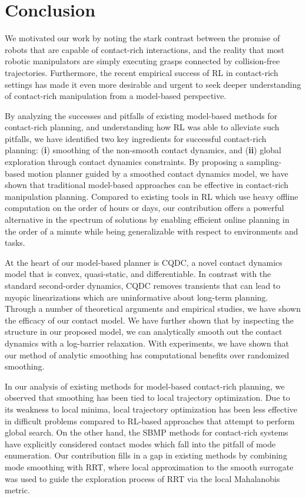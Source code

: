 \chapter{Conclusion} 
We motivated our work by noting the stark contrast between the promise of robots that are capable of contact-rich interactions, and the reality that most robotic manipulators are simply executing grasps connected by collision-free trajectories. Furthermore, the recent empirical success of RL in contact-rich settings has made it even more desirable and urgent to seek deeper understanding of contact-rich manipulation from a model-based perspective. 

By analyzing the successes and pitfalls of existing model-based methods for contact-rich planning, and understanding how RL was able to alleviate such pitfalls, we have identified two key ingredients for successful contact-rich planning: (\textbf{i}) smoothing of the non-smooth contact dynamics, and (\textbf{ii}) global exploration through contact dynamics constraints. By proposing a sampling-based motion planner guided by a smoothed contact dynamics model, we have shown that traditional model-based approaches can be effective in contact-rich manipulation planning. Compared to existing tools in RL which use heavy offline computation on the order of hours or days, our contribution offers a powerful alternative in the spectrum of solutions by enabling efficient online planning in the order of a minute while being generalizable with respect to environments and tasks. 

At the heart of our model-based planner is CQDC, a novel contact dynamics model that is convex, quasi-static, and differentiable. In contrast with the standard second-order dynamics, CQDC removes transients that can lead to myopic linearizations which are uninformative about long-term planning.
Through a number of theoretical arguments and empirical studies, we have shown the efficacy of our contact model. We have further shown that by inspecting the structure in our proposed model, we can analytically smooth out the contact dynamics with a log-barrier relaxation. With experiments, we have shown that our method of analytic smoothing has computational benefits over randomized smoothing.

In our analysis of existing methods for model-based contact-rich planning, we observed that smoothing has been tied to local trajectory optimization. Due to its weakness to local minima, local trajectory optimization has been less effective in difficult problems compared to RL-based approaches that attempt to perform global search. On the other hand, the SBMP methods for contact-rich systems have explicitly considered contact modes which fall into the pitfall of mode enumeration. Our contribution fills in a gap in existing methods by combining mode smoothing with RRT, where local approximation to the smooth surrogate was used to guide the exploration process of RRT via the local Mahalanobis metric.

